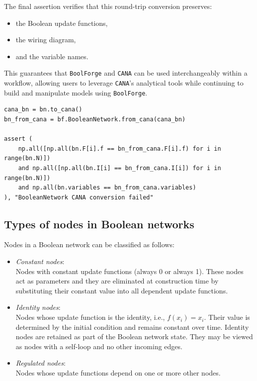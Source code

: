 \documentclass[
]{article}
\providecommand{\tightlist}{%
  \setlength{\itemsep}{0pt}\setlength{\parskip}{0pt}}
\begin{document}
The final assertion verifies that this round-trip conversion preserves:

\begin{itemize}
\tightlist
\item
  the Boolean update functions,
\item
  the wiring diagram,
\item
  and the variable names.
\end{itemize}

This guarantees that \texttt{BoolForge} and \texttt{CANA} can be used
interchangeably within a workflow, allowing users to leverage
\texttt{CANA}'s analytical tools while continuing to build and
manipulate models using \texttt{BoolForge}.

\begin{lstlisting}
cana_bn = bn.to_cana()
bn_from_cana = bf.BooleanNetwork.from_cana(cana_bn)

assert (
    np.all([np.all(bn.F[i].f == bn_from_cana.F[i].f) for i in range(bn.N)])
    and np.all([np.all(bn.I[i] == bn_from_cana.I[i]) for i in range(bn.N)])
    and np.all(bn.variables == bn_from_cana.variables)
), "BooleanNetwork CANA conversion failed"
\end{lstlisting}

\subsection{Types of nodes in Boolean
networks}\label{types-of-nodes-in-boolean-networks}

Nodes in a Boolean network can be classified as follows:

\begin{itemize}
\tightlist
\item
  \emph{Constant nodes}:\\
  Nodes with constant update functions (always 0 or always 1). These
  nodes act as parameters and they are eliminated at construction time
  by substituting their constant value into all dependent update
  functions.
\item
  \emph{Identity nodes}:\\
  Nodes whose update function is the identity, i.e., \(f(x_i) = x_i.\)
  Their value is determined by the initial condition and remains
  constant over time. Identity nodes are retained as part of the Boolean
  network state. They may be viewed as nodes with a self-loop and no
  other incoming edges.
\item
  \emph{Regulated nodes}:\\
  Nodes whose update functions depend on one or more other nodes.
\end{itemize}
\end{document}
